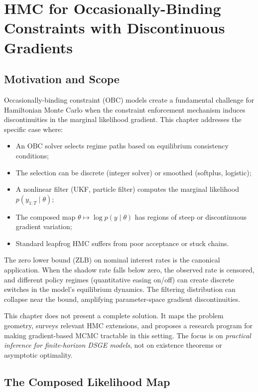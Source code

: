 \chapter{HMC for Occasionally-Binding Constraints with Discontinuous Gradients}
\label{ch:obc-discontinuous-gradient-hmc}

\section{Motivation and Scope}

Occasionally-binding constraint (OBC) models create a fundamental challenge for
Hamiltonian Monte Carlo when the constraint enforcement mechanism induces
discontinuities in the marginal likelihood gradient. This chapter addresses the
specific case where:
\begin{itemize}
  \item An OBC solver selects regime paths based on equilibrium consistency
    conditions;
  \item The selection can be discrete (integer solver) or smoothed (softplus,
    logistic);
  \item A nonlinear filter (UKF, particle filter) computes the marginal
    likelihood $p(y_{1:T} \mid \theta)$;
  \item The composed map $\theta \mapsto \log p(y \mid \theta)$ has regions of
    steep or discontinuous gradient variation;
  \item Standard leapfrog HMC suffers from poor acceptance or stuck chains.
\end{itemize}

The zero lower bound (ZLB) on nominal interest rates is the canonical
application. When the shadow rate falls below zero, the observed rate is
censored, and different policy regimes (quantitative easing on/off) can create
discrete switches in the model's equilibrium dynamics. The filtering
distribution can collapse near the bound, amplifying parameter-space gradient
discontinuities.

This chapter does not present a complete solution. It maps the problem
geometry, surveys relevant HMC extensions, and proposes a research program for
making gradient-based MCMC tractable in this setting. The focus is on
\emph{practical inference for finite-horizon DSGE models}, not on existence
theorems or asymptotic optimality.

\section{The Composed Likelihood Map}

